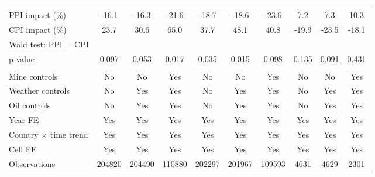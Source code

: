 {\begin{tabular}{l*{9}{c}}
\hline \\ PPI impact (\%)&       -16.1         &       -16.3         &       -21.6         &       -18.7         &       -18.6         &       -23.6         &         7.2         &         7.3         &        10.3         \\
CPI impact (\%)     &        23.7         &        30.6         &        65.0         &        37.7         &        48.1         &        40.8         &       -19.9         &       -23.5         &       -18.1         \\
Wald test: PPI = CPI&                     &                     &                     &                     &                     &                     &                     &                     &                     \\
\hspace{15pt} p-value&       0.097         &       0.053         &       0.017         &       0.035         &       0.015         &       0.098         &       0.135         &       0.091         &       0.431         \\
\hline \\ Mine controls&          No         &          No         &         Yes         &          No         &          No         &         Yes         &          No         &          No         &         Yes         \\
Weather controls    &          No         &         Yes         &         Yes         &          No         &         Yes         &         Yes         &          No         &         Yes         &         Yes         \\
Oil controls        &          No         &         Yes         &         Yes         &          No         &         Yes         &         Yes         &          No         &         Yes         &         Yes         \\
Year FE             &         Yes         &         Yes         &         Yes         &         Yes         &         Yes         &         Yes         &         Yes         &         Yes         &         Yes         \\
Country $\times$ time trend&         Yes         &         Yes         &         Yes         &         Yes         &         Yes         &         Yes         &         Yes         &         Yes         &         Yes         \\
Cell FE             &         Yes         &         Yes         &         Yes         &         Yes         &         Yes         &         Yes         &         Yes         &         Yes         &         Yes         \\
Observations        &      204820         &      204490         &      110880         &      202297         &      201967         &      109593         &        4631         &        4629         &        2301         \\
\hline\hline
\end{tabular}
}
